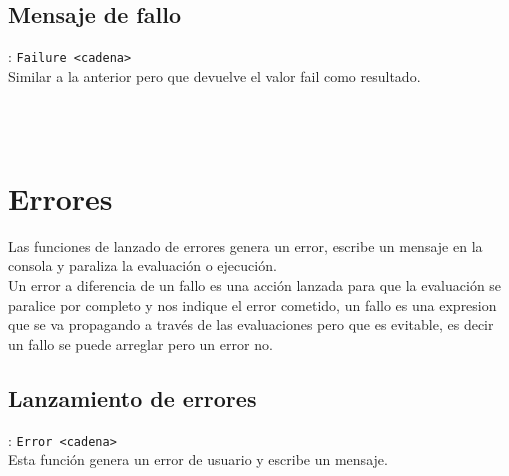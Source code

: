       \subsection*{Mensaje de fallo}: \texttt{Failure <cadena>}\\
      Similar a la anterior pero que devuelve el valor fail como resultado.
      
      \begin{fxcode}
         \\
         \\
      \end{fxcode}
      
   \section{Errores}
      Las funciones de lanzado de errores genera un error, escribe un mensaje en la consola y paraliza la evaluación o ejecución.
      \\
      
      Un error a diferencia de un fallo es una acción lanzada para que la evaluación se paralice por completo y nos indique el error cometido, un fallo es una expresion que se va propagando a través de las evaluaciones pero que es evitable, es decir un fallo se puede arreglar pero un error no.
      \\
      
      \subsection*{Lanzamiento de errores}: \texttt{Error <cadena>}\\
      Esta función genera un error de usuario y escribe un mensaje.
      
      \begin{fxcode}
         \\
      \end{fxcode}
      
      
      
      
   
   
   
   
   
   
   
   
   
   
   